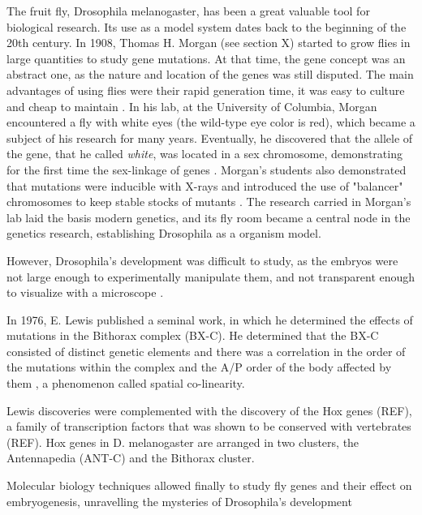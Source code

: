 The fruit fly, Drosophila melanogaster, has been a great valuable tool for biological research.
Its use as a model system dates back to the beginning of the 20th century.
In 1908, Thomas H. Morgan (see section X) started to grow flies in large quantities to study gene mutations. At that time, the gene concept was an abstract one, as the nature and location of the genes was still disputed.
%
The main advantages of using flies were their rapid generation time, it was easy to culture and cheap to maintain \citep{Arias2008}.
%
In his lab, at the University of Columbia, Morgan encountered a fly with white eyes (the wild-type eye color is red), which became a subject of his research for many years.
Eventually, he discovered that the allele of the gene, that he called \textit{white}, was located in a sex chromosome, demonstrating for the first time the sex-linkage of genes \citep{Morgan1919}.
%
Morgan's students also demonstrated that mutations were inducible with X-rays and introduced the use of "balancer" chromosomes to keep stable stocks of mutants \citep{Arias2008}.
%
The research carried in Morgan's lab laid the basis modern genetics, and its fly room became a central node in the genetics research, establishing Drosophila as a organism model.

However, Drosophila's development was difficult to study, as the embryos were not large enough to experimentally manipulate them, and not transparent enough to visualize with a microscope \citep{Gilbert2014}.


In 1976, E. Lewis published a seminal work, in which he determined the effects of mutations in the Bithorax complex (BX-C).
He determined that the BX-C consisted of distinct genetic elements and there was a correlation in the order of the mutations within the complex and the A/P order of the body affected by them \citep{Lewis1978}, a phenomenon called spatial co-linearity.

Lewis discoveries were complemented with the discovery of the Hox genes (REF), a family of transcription factors that was shown to be conserved with vertebrates (REF).
Hox genes in D. melanogaster are arranged in two clusters, the Antennapedia (ANT-C) and the Bithorax cluster.

Molecular biology techniques allowed finally to study fly genes and their effect on embryogenesis, unravelling the mysteries of Drosophila's development 


